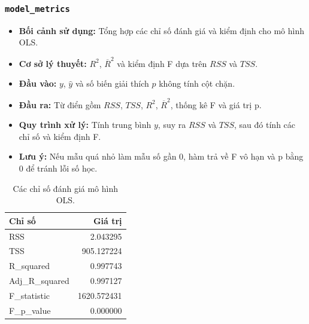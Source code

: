 \documentclass[a4paper]{article}
\newcommand{\code}[1]{\colorbox{light-gray}{\texttt{#1}}}
\begin{document}
\subsubsection{\code{model\_metrics}}
\begin{itemize}[leftmargin=*]
    \item \textbf{Bối cảnh sử dụng:} Tổng hợp các chỉ số đánh giá và kiểm định cho mô hình OLS.
    \item \textbf{Cơ sở lý thuyết:} $R^2$, $\overline{R}^2$ và kiểm định F dựa trên $RSS$ và $TSS$.
    \item \textbf{Đầu vào:} $y$, $\hat{y}$ và số biến giải thích $p$ không tính cột chặn.
    \item \textbf{Đầu ra:} Từ điển gồm $RSS$, $TSS$, $R^2$, $\overline{R}^2$, thống kê F và giá trị p.
    \item \textbf{Quy trình xử lý:} Tính trung bình $y$, suy ra $RSS$ và $TSS$, sau đó tính các chỉ số và kiểm định F.
    \item \textbf{Lưu ý:} Nếu mẫu quá nhỏ làm mẫu số gần 0, hàm trả về F vô hạn và p bằng 0 để tránh lỗi số học.
\end{itemize}
\begin{table}[H]
    \centering
    \small
    \begin{tabular}{lr}
    \toprule
    \textbf{Chỉ số} & \textbf{Giá trị} \\
    \midrule
    RSS & 2.043295 \\
    TSS & 905.127224 \\
    R\_squared & 0.997743 \\
    Adj\_R\_squared & 0.997127 \\
    F\_statistic & 1620.572431 \\
    F\_p\_value & 0.000000 \\
    \bottomrule
    \end{tabular}
    \caption{Các chỉ số đánh giá mô hình OLS.}
\end{table}
\end{document}
